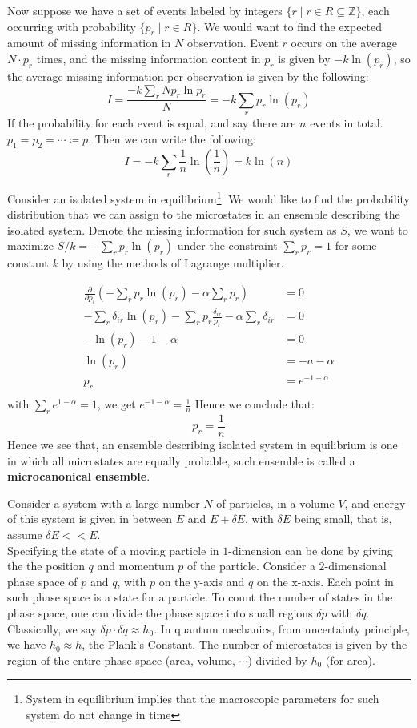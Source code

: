 \documentclass[11pt]{article}
\theoremstyle{break}
\theoremstyle{break}
\newcommand{\Z}{\mathbb{Z}}
\newcommand{\pd}{\partial}
\begin{document}
Now suppose we have a set of events labeled by integers $\{r \mid r\in R \subseteq \Z\}$, each occurring with probability $\{ p_r \mid r \in R\}$. We would want to find the expected amount of missing information in $N$ observation. Event $r$ occurs on the average $N\cdot p_r$ times, and the missing information content in $p_r$ is given by $-k \ln (p_r)$, so the average missing information per observation is given by the following:
$$I = \frac{-k \sum_r N p_r \ln p_r}{N} = -k \sum_r p_r \ln (p_r)$$
If the probability for each event is equal, and say there are $n$ events in total. $p_1 = p_2 = \cdots  \coloneqq p$. Then we can write the following:
$$I = -k \sum_r \frac{1}{n} \ln\left(\frac{1}{n}\right) = k\ln(n)$$

Consider an isolated system in equilibrium\footnote{System in equilibrium implies that the macroscopic parameters for such system do not change in time}. We would like to find the probability distribution that we can assign to the microstates in an ensemble describing the isolated system. Denote the missing information for such system as $S$, we want to maximize $S/k = -\sum_r p_r \ln (p_r)$ under the constraint $\sum_r p_r = 1$ for some constant $k$ by using the methods of Lagrange multiplier. 

\begin{align*}
\frac{\pd}{\pd p_i}\left( -\sum_r p_r \ln(p_r) - \alpha \sum_r p_r\right) &= 0\\
-\sum_r \delta_{ir} \ln( p_r) - \sum_r p_r \frac{\delta_{ir}}{p_r} - \alpha\sum_r \delta_{ir} &= 0\\
-\ln(p_r) - 1 - \alpha &= 0\\
\ln(p_r) &= -a-\alpha \\
p_r &= e^{-1-\alpha}\\
\end{align*}
with $\sum_r e^{1-\alpha} = 1$, we get $e^{-1-\alpha} = \frac{1}{n}$
Hence we conclude that:
$$p_r = \frac{1}{n}$$
Hence we see that, an ensemble describing isolated system in equilibrium is one in which all microstates are equally probable, such ensemble is called a \textbf{microcanonical ensemble}.\\
\newpage

Consider a system with a large number $N$ of particles, in a volume $V$, and energy of this system is given in between $E$ and $E+ \delta E$, with $\delta E$ being small, that is, assume $\delta E << E$. \\

Specifying the state of a moving particle in $1$-dimension can be done by giving the the position $q$ and momentum $p$ of the particle. Consider a $2$-dimensional phase space of $p$ and $q$, with $p$ on the y-axis and $q$ on the x-axis. Each point in such phase space is a state for a particle. To count the number of states in the phase space, one can divide the phase space into small regions $\delta p$ with $\delta q$. Classically, we say $\delta p \cdot \delta q \approx h_0$. In quantum mechanics, from uncertainty principle, we have $h_0 \approx h$, the Plank's Constant. The number of microstates is given by the region of the entire phase space (area, volume, $\cdots$) divided by $h_0$ (for area). \\
\end{document}
